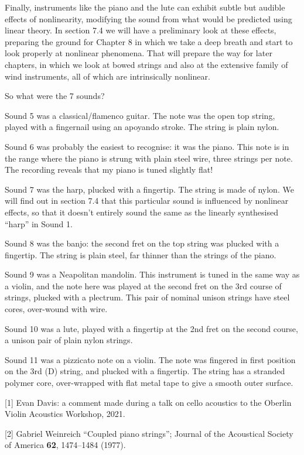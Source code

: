   Finally, instruments like the piano and the lute can exhibit subtle but 
  audible effects of nonlinearity, modifying the sound from what would be 
  predicted using linear theory. In section 7.4 we will have a preliminary look 
  at these effects, preparing the ground for Chapter 8 in which we take a deep 
  breath and start to look properly at nonlinear phenomena. That will prepare 
  the way for later chapters, in which we look at bowed strings and also at the 
  extensive family of wind instruments, all of which are intrinsically 
  nonlinear. 

  So what were the 7 sounds? 

  Sound 5 was a classical/flamenco guitar. The note was the open top string, 
  played with a fingernail using an apoyando stroke. The string is plain nylon. 

  Sound 6 was probably the easiest to recognise: it was the piano. This note is 
  in the range where the piano is strung with plain steel wire, three strings 
  per note. The recording reveals that my piano is tuned slightly flat! 

  Sound 7 was the harp, plucked with a fingertip. The string is made of nylon. 
  We will find out in section 7.4 that this particular sound is influenced by 
  nonlinear effects, so that it doesn't entirely sound the same as the linearly 
  synthesised ``harp'' in Sound 1. 

  Sound 8 was the banjo: the second fret on the top string was plucked with a 
  fingertip. The string is plain steel, far thinner than the strings of the 
  piano. 

  Sound 9 was a Neapolitan mandolin. This instrument is tuned in the same way 
  as a violin, and the note here was played at the second fret on the 3rd 
  course of strings, plucked with a plectrum. This pair of nominal unison 
  strings have steel cores, over-wound with wire. 

  Sound 10 was a lute, played with a fingertip at the 2nd fret on the second 
  course, a unison pair of plain nylon strings. 

  Sound 11 was a pizzicato note on a violin. The note was fingered in first 
  position on the 3rd (D) string, and plucked with a fingertip. The string has 
  a stranded polymer core, over-wrapped with flat metal tape to give a smooth 
  outer surface. 



  \sectionreferences{}[1] Evan Davis: a comment made during a talk on cello 
  acoustics to the Oberlin Violin Acoustics Workshop, 2021. 

  [2] Gabriel Weinreich ``Coupled piano strings''; Journal of the Acoustical 
  Society of America \textbf{62}, 1474--1484 (1977). 